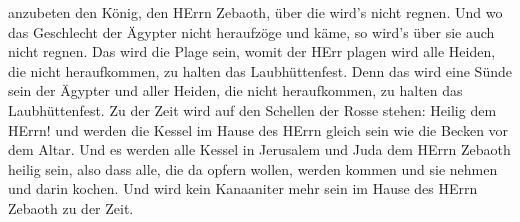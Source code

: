 anzubeten den König, den HErrn Zebaoth, über die wird's nicht regnen.
 Und wo das Geschlecht der Ägypter nicht heraufzöge und
käme, so wird's über sie auch nicht regnen. Das wird die Plage sein,
womit der HErr plagen wird alle Heiden, die nicht heraufkommen, zu
halten das Laubhüttenfest.  Denn das wird eine Sünde sein
der Ägypter und aller Heiden, die nicht heraufkommen, zu halten das
Laubhüttenfest.  Zu der Zeit wird auf den Schellen der
Rosse stehen: Heilig dem HErrn! und werden die Kessel im Hause des HErrn
gleich sein wie die Becken vor dem Altar.  Und es werden
alle Kessel in Jerusalem und Juda dem HErrn Zebaoth heilig sein, also
dass alle, die da opfern wollen, werden kommen und sie nehmen und darin
kochen. Und wird kein Kanaaniter mehr sein im Hause des HErrn Zebaoth zu
der Zeit.
